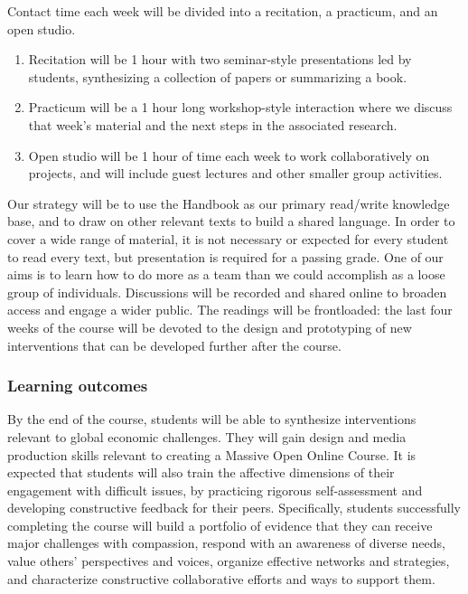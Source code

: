 Contact time each week will be divided into a recitation, a practicum,
and an open studio.

\begin{enumerate}
\def\labelenumi{\arabic{enumi}.}
\tightlist
\item
  Recitation will be 1 hour with two seminar-style presentations led by
  students, synthesizing a collection of papers or summarizing a book.
\item
  Practicum will be a 1 hour long workshop-style interaction where we
  discuss that week's material and the next steps in the associated
  research.
\item
  Open studio will be 1 hour of time each week to work collaboratively
  on projects, and will include guest lectures and other smaller group
  activities.
\end{enumerate}

Our strategy will be to use the Handbook as our primary read/write
knowledge base, and to draw on other relevant texts to build a shared
language. In order to cover a wide range of material, it is not
necessary or expected for every student to read every text, but
presentation is required for a passing grade. One of our aims is to
learn how to do more as a team than we could accomplish as a loose group
of individuals. Discussions will be recorded and shared online to
broaden access and engage a wider public. The readings will be
frontloaded: the last four weeks of the course will be devoted to the
design and prototyping of new interventions that can be developed
further after the course.

\hypertarget{learning-outcomes}{%
\subsubsection{Learning outcomes}\label{learning-outcomes}}

By the end of the course, students will be able to synthesize
interventions relevant to global economic challenges. They will gain
design and media production skills relevant to creating a Massive Open
Online Course. It is expected that students will also train the
affective dimensions of their engagement with difficult issues, by
practicing rigorous self-assessment and developing constructive feedback
for their peers. Specifically, students successfully completing the
course will build a portfolio of evidence that they can receive major
challenges with compassion, respond with an awareness of diverse needs,
value others' perspectives and voices, organize effective networks and
strategies, and characterize constructive collaborative efforts and ways
to support them.

